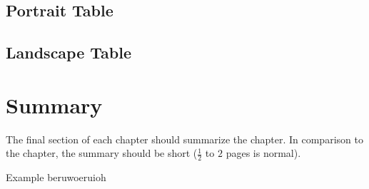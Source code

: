 \newpage %
\subsection{Portrait Table}

\subsection{Landscape Table}

\section{Summary}
\label{s:Background-Summary}

The final section of each chapter should summarize the chapter. In comparison to the chapter, the summary should be short ($\frac{1}{2}$ to $2$ pages is normal).

Example beruwoeruioh \cite{HerbertF:1965:Dune} \citeauthor{HerbertB:2002:Butlerian-Jihad} \citeyear{HerbertB:2000:Harkonnen}
